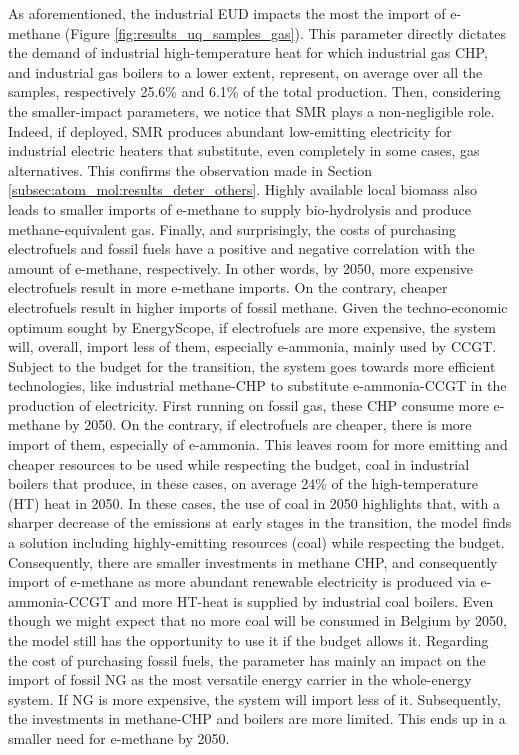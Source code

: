 As aforementioned, the industrial \gls{EUD} impacts the most the import of e-methane (Figure \ref{fig:results_uq_samples_gas}). This parameter directly dictates the demand of industrial high-temperature heat for which industrial gas \gls{CHP}, and industrial gas boilers to a lower extent, represent, on average over all the samples, respectively 25.6\% and 6.1\% of the total production. Then, considering the smaller-impact parameters, we notice that \gls{SMR} plays a non-negligible role. Indeed, if deployed, \gls{SMR} produces abundant low-emitting electricity for industrial electric heaters that substitute, even completely in some cases, gas alternatives. This confirms the observation made in Section \ref{subsec:atom_mol:results_deter_others}. Highly available local biomass also leads to smaller imports of e-methane to supply bio-hydrolysis and produce methane-equivalent gas. Finally, and surprisingly, the costs of purchasing electrofuels and fossil fuels have a positive and negative correlation with the amount of e-methane, respectively. In other words, by 2050, more expensive electrofuels result in more e-methane imports. On the contrary, cheaper electrofuels result in higher imports of fossil methane. Given the techno-economic optimum sought by EnergyScope, if electrofuels are more expensive, the system will, overall, import less of them, especially e-ammonia, mainly used by \gls{CCGT}. Subject to the  budget for the transition, the system goes towards more efficient technologies, like industrial methane-\gls{CHP} to substitute e-ammonia-\gls{CCGT} in the production of electricity. First running on fossil gas, these \gls{CHP} consume more e-methane by 2050. On the contrary, if electrofuels are cheaper, there is more import of them, especially of e-ammonia. This leaves room for more emitting and cheaper resources to be used while respecting the  budget, \ie coal in industrial boilers that produce, in these cases, on average 24\% of the high-temperature (HT) heat in 2050. In these cases, the use of coal in 2050 highlights that, with a sharper decrease of the emissions at early stages in the transition, the model finds a solution including highly-emitting resources (\eg coal) while respecting the  budget. Consequently, there are smaller investments in methane \gls{CHP}, and consequently import of e-methane as more abundant renewable electricity is produced via e-ammonia-\gls{CCGT} and more HT-heat is supplied by industrial coal boilers. Even though we might expect that no more coal will be consumed in Belgium by 2050, the model still has the opportunity to use it if the  budget allows it. Regarding the cost of purchasing fossil fuels, the parameter has mainly an impact on the import of fossil \gls{NG} as the most versatile energy carrier in the whole-energy system. If \gls{NG} is more expensive, the system will import less of it. Subsequently, the investments in methane-\gls{CHP} and boilers are more limited. This ends up in a smaller need for e-methane by 2050.

